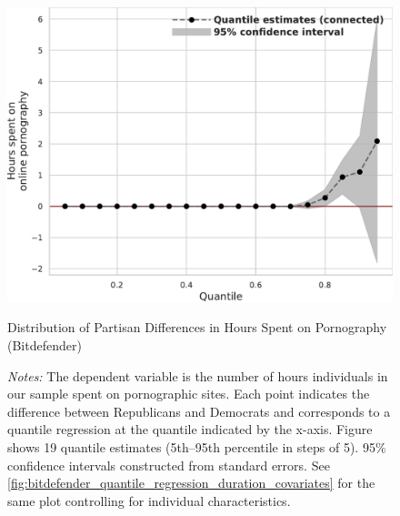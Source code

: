 \documentclass[12pt,twoside]{article}
\begin{document}
\begin{figure}[t]
	\centering
	\includegraphics[width=.6\linewidth]{figs/bitdefender_quantile_reg_duration_adult.pdf}
	\caption{Distribution of Partisan Differences in Hours Spent on Pornography (Bitdefender)}
	\caption*{\footnotesize \emph{Notes:} 
		The dependent variable is the number of hours individuals in our sample spent on pornographic sites.
		Each point indicates the difference between Republicans and Democrats and corresponds to a quantile regression at the quantile indicated by the x-axis.
  Figure shows 19 quantile estimates (5th--95th percentile in steps of 5).
		95\% confidence intervals constructed from standard errors.
		See \cref{fig:bitdefender_quantile_regression_duration_covariates} for the same plot controlling for individual characteristics.
	}
	\label{fig:bitdefender_quantile_regression_duration}
\end{figure}
\end{document}
